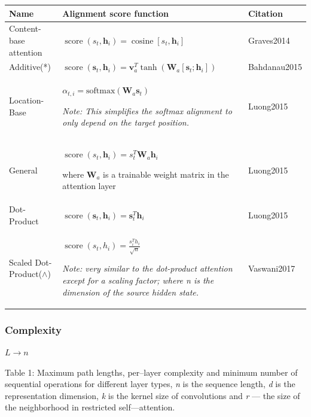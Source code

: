 \documentclass[10pt]{article}
\begin{document}
\begin{center}
\renewcommand{\arraystretch}{1.5}
\begin{tabular}{|m{2.3cm}|m{10cm}|m{2.3cm}|}
\hline
\rule{0pt}{10pt}\textbf{Name} & \textbf{Alignment score function} & \textbf{Citation} \\
\hline
\rule{0pt}{8pt}Content-base attention & $\operatorname{score}\left(s_t, \boldsymbol{h}_i\right)=\operatorname{cosine}\left[s_t, \boldsymbol{h}_i\right]$ & Graves2014 \\
\hline
Additive(*) & $\operatorname{score}\left(\boldsymbol{s}_t, \boldsymbol{h}_i\right)=\mathbf{v}_a^{T} \tanh \left(\mathbf{W}_a\left[\boldsymbol{s}_t ; \boldsymbol{h}_i\right]\right)$ & Bahdanau2015 \\
\hline
Location-Base & $\alpha_{t, i}=\text{softmax}\left(\mathbf{W}_a \boldsymbol{s}_t\right)$

\textit{Note: This simplifies the softmax alignment to only depend on the target position.} & Luong2015 \\
\hline
General & $\operatorname{score}\left(s_t, \boldsymbol{h}_i\right)=s_t^{T} \mathbf{W}_a \boldsymbol{h}_i$

where $\mathbf{W}_a$ is a trainable weight matrix in the attention layer & Luong2015 \\
\hline
Dot-Product & $\operatorname{score}\left(\boldsymbol{s}_t, \boldsymbol{h}_i\right)=\boldsymbol{s}_t^{T} \boldsymbol{h}_i$ & Luong2015 \\
\hline
Scaled Dot-Product($\wedge$) & $\operatorname{score}\left(s_t, h_i\right)=\frac{s_i^{T} h_i}{\sqrt{n}}$

\textit{Note: very similar to the dot-product attention except for a scaling factor; where n is the dimension of the source hidden state.} & Vaswani2017 \\
\hline
\end{tabular}
\end{center}

\subsubsection{Complexity}

$L \rightarrow n$

Table 1: Maximum path lengths, per--layer complexity and minimum number of sequential operations for different layer types, \textit{n} is the sequence length, \textit{d} is the representation dimension, \textit{k} is the kernel size of convolutions and \textit{r} --- the size of the neighborhood in restricted self---attention.
\end{document}
